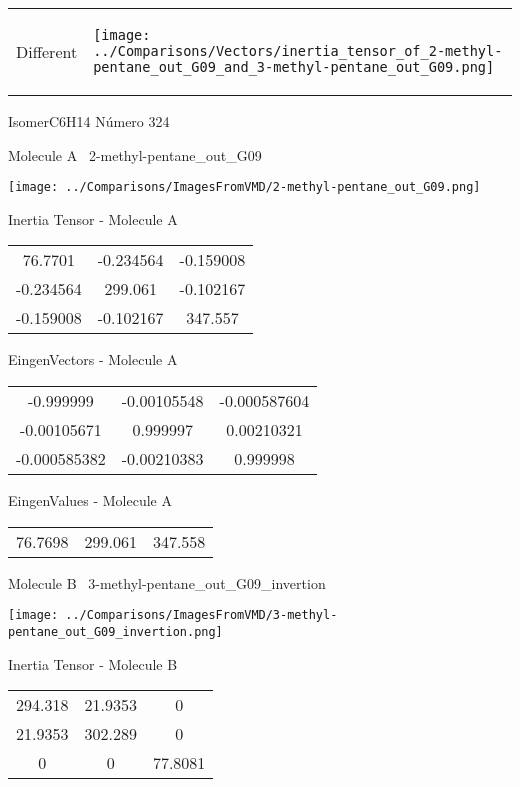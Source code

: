 \vtab[-5mm]
\begin{tabular}{*{2}{m{}}}
\begin{center}
\textcolor{NavyBlue}{\Large Different}
\end{center}
&
\begin{center}
\texttt{[image: ../Comparisons/Vectors/inertia\_tensor\_of\_2-methyl-pentane\_out\_G09\_and\_3-methyl-pentane\_out\_G09.png]}
\end{center}
\end{tabular}

 \newpage

\vtab[-3cm]
\begin{center}
{\large IsomerC6H14 \tab Número 324}
\end{center}
\begin{multicols}{2}
\begin{center}

Molecule A \
2-methyl-pentane\_out\_G09

\texttt{[image: ../Comparisons/ImagesFromVMD/2-methyl-pentane\_out\_G09.png]}

Inertia Tensor - Molecule A \\
\begin{tabular}{|c c c|}
76.7701	 & 	-0.234564	 & 	-0.159008	 \\
-0.234564	 & 	299.061	 & 	-0.102167	 \\
-0.159008	 & 	-0.102167	 & 	347.557
\end{tabular}

\vtab
 EingenVectors - Molecule A     \\
\begin{tabular}{|c c c|}
-0.999999	 & 	-0.00105548	 & 	-0.000587604	 \\
-0.00105671	 & 	0.999997	 & 	0.00210321	 \\
-0.000585382	 & 	-0.00210383	 & 	0.999998
\end{tabular}

\vtab
 EingenValues - Molecule A     \\
\begin{tabular}{|c c c|}
76.7698	 & 	299.061	 & 	347.558	 \\
\end{tabular}
\columnbreak

Molecule B \
3-methyl-pentane\_out\_G09\_invertion

\texttt{[image: ../Comparisons/ImagesFromVMD/3-methyl-pentane\_out\_G09\_invertion.png]}

Inertia Tensor - Molecule B \\
\begin{tabular}{|c c c|}
294.318	 & 	21.9353	 & 	0	 \\
21.9353	 & 	302.289	 & 	0	 \\
0	 & 	0	 & 	77.8081
\end{tabular}


\end{center}
\end{multicols}
